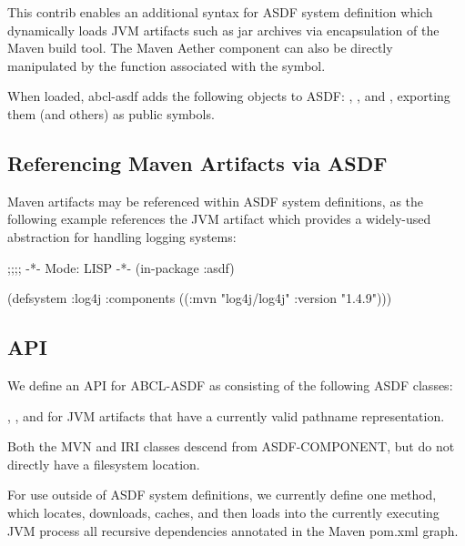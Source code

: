 \documentclass[10pt]{book}
\begin{document}
This contrib enables an additional syntax for \textsc{ASDF} system
definition which dynamically loads \textsc{JVM} artifacts such as jar
archives via encapsulation of the Maven build tool.  The Maven Aether
component can also be directly manipulated by the function associated
with the  symbol.



When loaded, abcl-asdf adds the following objects to \textsc{ASDF}:
, ,  and
, exporting them (and others) as public symbols.

\subsection{Referencing Maven Artifacts via ASDF}

Maven artifacts may be referenced within \textsc{ASDF} system
definitions, as the following example references the
 JVM artifact which provides a widely-used
abstraction for handling logging systems:

\begin{listing-lisp}
;;;; -*- Mode: LISP -*-
(in-package :asdf)

(defsystem :log4j
  :components ((:mvn "log4j/log4j" :version "1.4.9")))
\end{listing-lisp}

\subsection{API}

We define an API for \textsc{ABCL-ASDF} as consisting of the following
ASDF classes:

, , and
 for JVM artifacts that have a currently
valid pathname representation.

Both the MVN and IRI classes descend from ASDF-COMPONENT, but do not
directly have a filesystem location.

For use outside of ASDF system definitions, we currently define one
method,  which locates,
downloads, caches, and then loads into the currently executing JVM
process all recursive dependencies annotated in the Maven pom.xml
graph.
\end{document}

